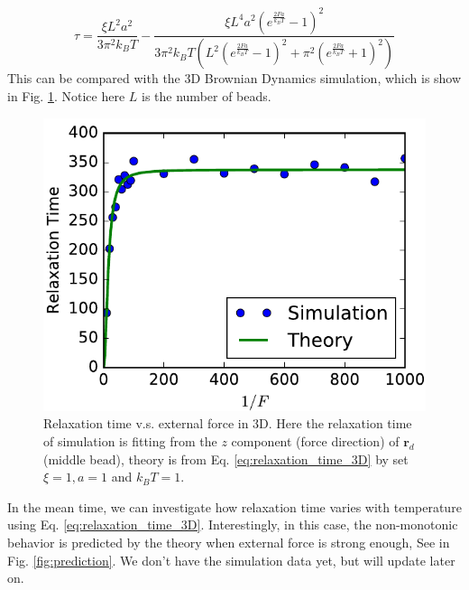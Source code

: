 \documentclass[12pt,a4paper]{article}
\begin{document}
\begin{equation}
    \label{eq:relaxation_time_3D}
    \tau = \frac{\xi L^2 a^2}{3 \pi^2 k_{B} T}
    - \frac{\xi L^4 a^2 \left(e^{\frac{2 F a}{k_{B} T}} - 1\right)^2}
    {3 \pi^2 k_{B} T \left(L^2 \left(e^{\frac{2 F a}{k_{B}T}} - 1\right)^2 +
            \pi^2 \left(e^{\frac{2 F a}{k_{B}T}} + 1\right)^2\right)} 
\end{equation}
This can be compared with the 3D Brownian Dynamics simulation, which is show in
Fig. \ref{fig:relaxation3D}. Notice here $L$ is the number of beads. 
\begin{figure}[htpb]
    \centering
    \includegraphics[width=0.8\linewidth]{relaxation3D.pdf}
    \caption{Relaxation time v.s. external force in 3D. Here the relaxation
        time of simulation is fitting from the $z$ component (force direction)
        of $\mathbf{r}_d$ (middle bead), theory is from Eq.
        \eqref{eq:relaxation_time_3D} by set $\xi=1, a=1$ and $k_B T=1$.}
    \label{fig:relaxation3D}
\end{figure}

In the mean time, we can investigate how relaxation time varies with
temperature using Eq. \eqref{eq:relaxation_time_3D}. Interestingly, in this
case, the non-monotonic behavior is predicted by the theory when external force
is strong enough, See in Fig. \ref{fig:prediction}. We don't have the simulation
data yet, but will update later on.
\end{document}
